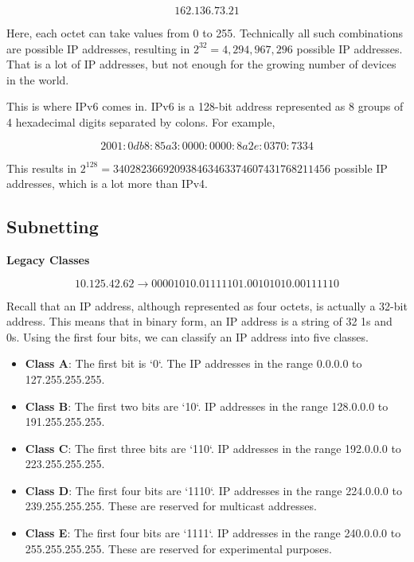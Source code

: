 \[
162.136.73.21
\]

Here, each octet can take values from 0 to 255.
Technically all such combinations are possible
IP addresses, resulting in
$2^{32} = 4,294,967,296$ possible IP addresses.
That is a lot of IP addresses, but not enough
for the growing number of devices in the world.

This is where IPv6 comes in. IPv6 is a 128-bit
address represented as 8 groups of 4 hexadecimal
digits separated by colons. For example,

\[
2001:0db8:85a3:0000:0000:8a2e:0370:7334
\]


This results in
$2^{128} = 340282366920938463463374607431768211456$
possible IP addresses, which is a lot more than
IPv4.

\subsection{Subnetting}

\textbf{Legacy Classes}

\[
10.125.42.62 \rightarrow 0 0 0 0 1 0 1 0 . 0 1 1 1 1 1 0 1 . 0 0 1 0 1 0 1 0 . 0 0 1 1 1 1 1 0
\]

Recall that an IP address, although represented as
four octets, is actually a 32-bit address. This
means that in binary form, an IP address is a
string of 32 1s and 0s. Using the first four bits,
we can classify an IP address into five classes.

\begin{itemize}
\item \textbf{Class A}: The first bit is `0`. The
IP addresses in the range 0.0.0.0 to 127.255.255.255.
\item \textbf{Class B}: The first two bits are `10`.
IP addresses in the range 128.0.0.0 to 191.255.255.255.
\item \textbf{Class C}: The first three bits are `110`.
IP addresses in the range 192.0.0.0 to 223.255.255.255.
\item \textbf{Class D}: The first four bits are `1110`.
IP addresses in the range 224.0.0.0 to 239.255.255.255.
These are reserved for multicast addresses.
\item \textbf{Class E}: The first four bits are `1111`.
IP addresses in the range 240.0.0.0 to 255.255.255.255.
These are reserved for experimental purposes.
\end{itemize}

